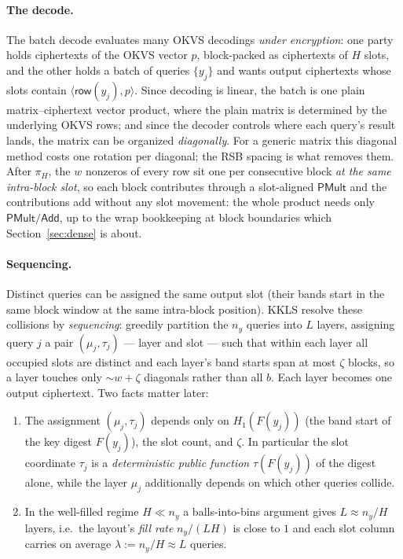\documentclass[runningheads]{llncs}
\newcommand{\PMult}{\mathsf{PMult}}          %
\newcommand{\CAdd}{\mathsf{Add}}             %
\newcommand{\row}{\mathsf{row}}
\newcommand{\band}{w}                        %
\newcommand{\half}{H}                        %
\begin{document}
\paragraph{The decode.}
The batch decode evaluates many OKVS decodings \emph{under encryption}: one party holds
ciphertexts of the OKVS vector $p$, block-packed as ciphertexts of $\half$ slots, and
the other holds a batch of queries $\{y_j\}$ and wants output ciphertexts whose slots
contain $\langle\row(y_j),p\rangle$. Since decoding is linear, the batch is one plain
matrix--ciphertext vector product, where the plain matrix is determined by the
underlying OKVS rows; and since the decoder controls where each query's result lands,
the matrix can be organized \emph{diagonally}. For a generic matrix this diagonal
method costs one rotation per diagonal; the RSB spacing is what removes them. After
$\pi_\half$, the $\band$ nonzeros of every row sit one per consecutive block \emph{at
the same intra-block slot}, so each block contributes through a slot-aligned $\PMult$
and the contributions add without any slot movement: the whole product needs only
$\PMult/\CAdd$, up to the wrap bookkeeping at block boundaries which Section~\ref{sec:dense}
is about.

\paragraph{Sequencing.}
Distinct queries can be assigned the same output slot (their bands start in the same
block window at the same intra-block position). KKLS resolve these collisions by
\emph{sequencing}: greedily partition the $n_y$ queries into $L$ layers, assigning
query $j$ a pair $(\mu_j,\tau_j)$ --- layer and slot --- such that within each layer all
occupied slots are distinct and each layer's band starts span at most $\zeta$ blocks,
so a layer touches only $\sim\band+\zeta$ diagonals rather than all $b$. Each layer
becomes one output ciphertext. Two facts matter later:
\begin{enumerate}
  \item The assignment $(\mu_j,\tau_j)$ depends only on $H_1(F(y_j))$ (the band
  start of the key digest $F(y_j)$), the slot count, and $\zeta$. In particular the
  slot coordinate $\tau_j$ is a \emph{deterministic public function}
  $\tau(F(y_j))$ of the digest alone, while the layer $\mu_j$ additionally depends
  on which other queries collide.
  \item In the well-filled regime $\half\ll n_y$ a balls-into-bins argument gives
  $L\approx n_y/\half$ layers, i.e.\ the layout's \emph{fill rate}
  $n_y/(L\half)$ is close to $1$ and each slot column carries on average
  $\lambda:=n_y/\half\approx L$ queries.
\end{enumerate}
\end{document}
